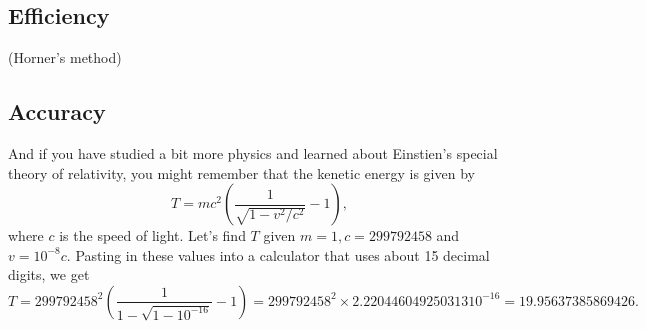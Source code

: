 \documentclass[12pt,fleqn]{article}
\begin{document}
\subsection*{Efficiency}

(Horner's method)

\subsection*{Accuracy} 


And if  you have studied a bit more physics and learned about Einstien's  special theory of relativity, you might remember that the kenetic energy is given by 
\[
    T  =  m c^2 \left (\frac{1}{\sqrt{1- v^2/c^2}} - 1\right),
\]
where $c$ is the speed of light.  Let's find $T$ given $m = 1, c =  299792458$ and $v= 10^{-8} c$.  Pasting in these values into a calculator that uses about 15 decimal digits, we get
\[
   T =  299792458^2 \left(\frac{1}{1 - \sqrt{1-10^{-16}}} -1 \right) = 299792458^2 \times 2.220446049250313 {{10}^{-16}} = 19.95637385869426.
\]
\end{document}
